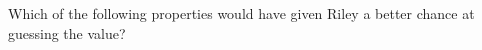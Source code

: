 \documentclass{ximera}
\begin{document}
\begin{problem}
  Which of the following properties would have given Riley a better chance at guessing the value?
  \begin{selectAll}
  \end{selectAll}
\end{problem}



%
\end{document}
